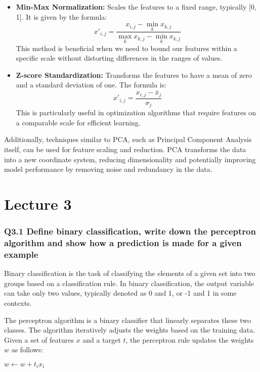 \documentclass[11pt]{article}
\begin{document}
\begin{itemize}
    \item \textbf{Min-Max Normalization:} Scales the features to a fixed range, typically [0, 1]. It is given by the formula:
    \[
    x'_{i,j} = \frac{x_{i,j} - \min_k x_{k,j}}{\max_k x_{k,j} - \min_k x_{k,j}}
    \]
    This method is beneficial when we need to bound our features within a specific scale without distorting differences in the ranges of values.
    
    \item \textbf{Z-score Standardization:} Transforms the features to have a mean of zero and a standard deviation of one. The formula is:
    \[
    x'_{i,j} = \frac{x_{i,j} - \bar{x}_j}{\sigma_j}
    \]
    This is particularly useful in optimization algorithms that require features on a comparable scale for efficient learning.
\end{itemize}

Additionally, techniques similar to PCA, such as Principal Component Analysis itself, can be used for feature scaling and reduction. PCA transforms the data into a new coordinate system, reducing dimensionality and potentially improving model performance by removing noise and redundancy in the data.


\part{Lecture 3}

\section{Q3.1 Define binary classification, write down the perceptron algorithm and show how a prediction is made for a given example}

Binary classification is the task of classifying the elements of a given set into two groups based on a classification rule. In binary classification, the output variable can take only two values, typically denoted as 0 and 1, or -1 and 1 in some contexts.

The perceptron algorithm is a binary classifier that linearly separates these two classes. The algorithm iteratively adjusts the weights based on the training data. Given a set of features \( x \) and a target \( t \), the perceptron rule updates the weights \( w \) as follows:

\begin{algorithmic}
    \State \( w \gets w + t_i x_i \)
\EndIf
\end{algorithmic}
\end{document}

